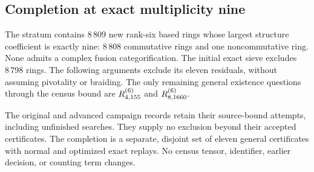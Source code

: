 \subsection{Completion at exact multiplicity nine}
\label{sec:multiplicity-nine}
The stratum contains $8\,809$ new rank-six based rings whose largest
structure coefficient is exactly nine: $8\,808$ commutative rings and one
noncommutative ring. None admits a complex fusion categorification.
The initial exact sieve excludes $8\,798$ rings. The following arguments
exclude its eleven residuals, without assuming pivotality or braiding.
The only remaining general existence questions through the census bound
are $R^{(6)}_{4,155}$ and $R^{(6)}_{8,1660}$.

The original and advanced campaign records retain their source-bound
attempts, including unfinished searches. They supply no exclusion beyond
their accepted certificates. The completion is a separate, disjoint set
of eleven general certificates with normal and optimized exact replays.
No census tensor, identifier, earlier decision, or counting term changes.


